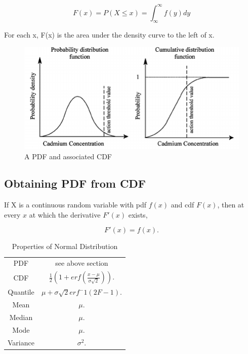 \documentclass[12pt, a4paper]{report}
\begin{document}
  \begin{equation}
    F(x) = P(X \leq x) = \int_{\infty}^{\infty} f(y)dy
  \end{equation}

  For each x, F(x) is the area under the density curve to the left of x.

  \begin{figure}
    \centering
    \includegraphics[width=\textwidth]{figures/cumulativedist.png}
    \caption{A PDF and associated CDF}
  \end{figure}

  \subsection{Obtaining PDF from CDF}

  If X is a continuous random variable with pdf $ f(x) $ and cdf $ F(x) $, then at every $ x $ at which the derivative $ F'(x) $ exists,

  \[
      F'(x) = f(x)
    .\]

  \begin{table}
    \centering
    \caption{Properties of Normal Distribution}
    \begin{tabular}{c c}
      PDF & see above section \\
      CDF & $ \frac{1}{2} \left( 1 + erf \left( \frac{x - \mu}{\sigma\sqrt{2}} \right) \right). $ \\
      Quantile & $ \mu + \sigma\sqrt{2}erf^-1 (2F - 1). $ \\
      Mean & $ \mu. $ \\
      Median & $ \mu. $ \\
      Mode & $ \mu. $ \\
      Variance & $ \sigma ^2. $
    \end{tabular}

  \end{table}
\end{document}
